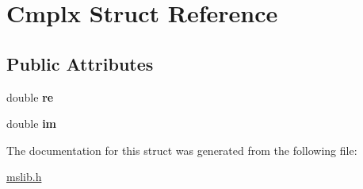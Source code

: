 \hypertarget{structCmplx}{\section{Cmplx Struct Reference}
\label{structCmplx}
}
\subsection*{Public Attributes}
\begin{DoxyCompactItemize}
\item 
\hypertarget{structCmplx_af4f6cad7039b682154f6c7fb92f3bb40}{double {\bfseries re}}\label{structCmplx_af4f6cad7039b682154f6c7fb92f3bb40}

\item 
\hypertarget{structCmplx_a43a0db2740866df30cc168d6a0a0d7b1}{double {\bfseries im}}\label{structCmplx_a43a0db2740866df30cc168d6a0a0d7b1}

\end{DoxyCompactItemize}


The documentation for this struct was generated from the following file\-:\begin{DoxyCompactItemize}
\item 
\hyperlink{mslib_8h}{mslib.\-h}\end{DoxyCompactItemize}

